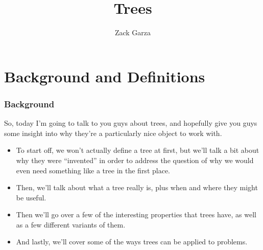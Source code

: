 \documentclass[a4paper,10pt]{report}
\title{Trees}
\author{Zack Garza}
\begin{document}
\maketitle

\begin{abstract}
\tableofcontents
\end{abstract}

\chapter{Background and Definitions}

\subsection{Background}
So, today I'm going to talk to you guys about trees, and hopefully give you guys some insight into why they're a particularly nice object to work with.

\begin{itemize}

\item To start off, we won't actually define a tree at first, but we'll talk a bit about why they were ``invented'' in order to address the question of why we would even need something like a tree in the first place.

\item Then, we'll talk about what a tree really is, plus when and where they might be useful.

\item Then we'll go over a few of the interesting properties that trees have, as well as a few different variants of them.

\item And lastly, we'll cover some of the ways trees can be applied to problems.\\
\end{itemize}
\end{document}

